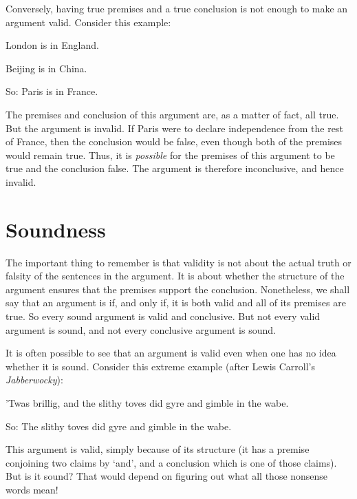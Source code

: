 Conversely, having true premises and a true conclusion is not enough to make an argument valid. Consider this example:
	\begin{earg}
		\item[] London is in England.
		\item[] Beijing is in China.
		\item[So:] Paris is in France.
	\end{earg}
The premises and conclusion of this argument are, as a matter of fact, all true. But the argument is invalid. If Paris were to declare independence from the rest of France, then the conclusion would be false, even though both of the premises would remain true. Thus, it is \emph{possible} for the premises of this argument to be true and the conclusion false. The argument is therefore inconclusive, and hence invalid.

\section{Soundness}

The important thing to remember is that validity is not about the actual truth or falsity of the sentences in the argument. It is about whether the structure of the argument ensures that the premises support the conclusion. Nonetheless, we shall say that an argument is  if, and only if, it is both valid and all of its premises are true. So every sound argument is valid and conclusive. But not every valid argument is sound, and not every conclusive argument is sound.

It is often possible to see that an argument is valid even when one has no idea whether it is sound. Consider this extreme example (after Lewis Carroll's \emph{Jabberwocky}):
\begin{earg}
	\item[] ’Twas brillig, \textsf{and} the slithy toves did gyre and gimble in the wabe.
	\item[So:] The slithy toves did gyre and gimble in the wabe.
\end{earg} This argument is valid, simply because of its structure (it has a premise conjoining two claims by `and', and a conclusion which is one of those claims). But is it sound? That would depend on figuring out what all those nonsense words mean!


